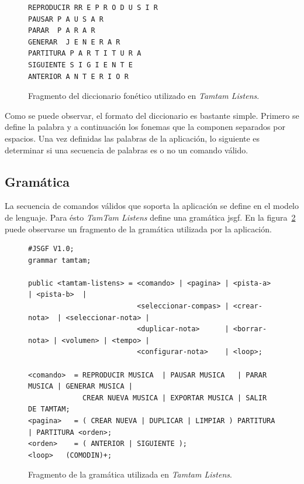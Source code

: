 \lstset{
  basicstyle=\scriptsize,        %
  breakatwhitespace=false,         %
  frame=single,                    %
  language=Octave,                 %
  numbersep=5pt,                   %
  showstringspaces=false,          %
  stepnumber=2,                    %
  tabsize=2                       %
}

\begin{figure}[H]
\begin{lstlisting}
REPRODUCIR RR E P R O D U S I R
PAUSAR P A U S A R
PARAR  P A R A R
GENERAR  J E N E R A R
PARTITURA P A R T I T U R A
SIGUIENTE S I G I E N T E
ANTERIOR A N T E R I O R
\end{lstlisting}
\caption{Fragmento del diccionario fon\'etico utilizado en \emph{Tamtam Listens}.}
\label{figure:fragmento-dic}
\end{figure}

Como se puede observar, el formato del diccionario es bastante simple. Primero se define la palabra y 
a continuaci\'on los fonemas que la componen separados por espacios.
Una vez definidas las palabras de la aplicaci\'on, lo siguiente es determinar si una secuencia de palabras es o no un 
comando v\'alido.

\subsection{Gram\'atica}

La secuencia de comandos v\'alidos que soporta la aplicaci\'on se define en el modelo de lenguaje. Para \'esto
\emph{TamTam Listens} define una gram\'atica \gls{jsgf}. En la figura~\ref{figure:fragmento-gram} 
puede observarse un fragmento de la gram\'atica utilizada por la aplicaci\'on.

\begin{figure}[H]
\begin{lstlisting}
#JSGF V1.0;
grammar tamtam;

public <tamtam-listens> = <comando> | <pagina> | <pista-a>     | <pista-b>  | 
                          <seleccionar-compas> | <crear-nota>  | <seleccionar-nota> | 
                          <duplicar-nota>      | <borrar-nota> | <volumen> | <tempo> | 
                          <configurar-nota>    | <loop>;

<comando>  = REPRODUCIR MUSICA  | PAUSAR MUSICA   | PARAR MUSICA | GENERAR MUSICA | 
             CREAR NUEVA MUSICA | EXPORTAR MUSICA | SALIR DE TAMTAM;
<pagina>   = ( CREAR NUEVA | DUPLICAR | LIMPIAR ) PARTITURA | PARTITURA <orden>;
<orden>    = ( ANTERIOR | SIGUIENTE );
<loop>   (COMODIN)+;
\end{lstlisting}
\caption{Fragmento de la gram\'atica utilizada en \emph{Tamtam Listens}.}
\label{figure:fragmento-gram}
\end{figure} 


